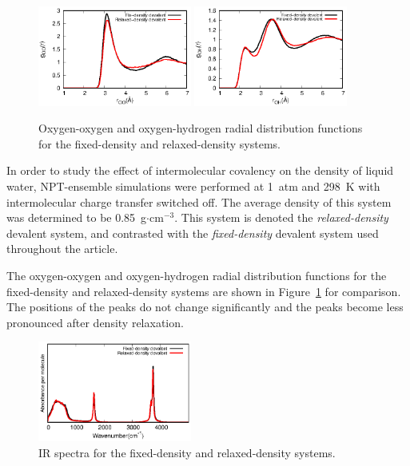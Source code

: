 \documentclass[aps,prl,reprint,amsmath,amssymb]{revtex4-1}
\begin{document}
\begin{figure}
\includegraphics[width=0.45\textwidth]{cp_rdf}
\includegraphics[width=0.45\textwidth]{cp_oh_rdf}
\caption{Oxygen-oxygen and oxygen-hydrogen radial distribution functions for the fixed-density and relaxed-density systems.}\label{Fig:rdf_cp}
\end{figure} 

In order to study the effect of intermolecular covalency on the density of liquid water, NPT-ensemble simulations were performed at 1~atm and 298~K with intermolecular charge transfer switched off. The average density of this system was determined to be 0.85~g$\cdot$cm$^{-3}$. 
This system is denoted the \emph{relaxed-density} devalent system, and contrasted with the \emph{fixed-density} devalent system used throughout the article. 

The oxygen-oxygen and oxygen-hydrogen radial distribution functions for the fixed-density and relaxed-density systems are shown in Figure~\ref{Fig:rdf_cp} for comparison. 
The positions of the peaks do not change significantly and the peaks become less pronounced after density relaxation.

\begin{figure}
\includegraphics[width=0.45\textwidth]{cp_ir}
\caption{
IR spectra for the fixed-density and relaxed-density systems.}\label{Fig:ir_cp}
\end{figure} 
\end{document}
